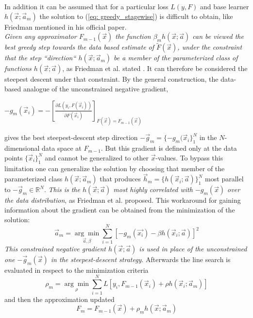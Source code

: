 \documentclass[12pt, a4paper]{article}
\begin{document}
In addition it can be assumed that for a particular loss $L(y,F)$ and base learner $h(\vec{x};\vec{a}_m)$ the solution to (\ref{eq: greedy_stagewise}) is difficult to obtain, like Friedman mentioned in his official paper.
\\
\textit{Given any approximator $F_{m-1}(\vec{x})$ the function $\beta_m h(\vec{x};\vec{a})$ can be viewed the best greedy step towards the data based estimate of $\tilde{F}(\vec{x})$, under the constraint that the step ``direction`` $h(\vec{x};\vec{a}_m)$ be a member of the parameterized class of functions $h(\vec{x};\vec{a})$}, as Friedman et al. stated \cite{Friedman2001}. It can therefore be considered the steepest descent under that constraint. By the general construction, the data-based analogue of the unconstrained negative gradient,
\begin{center}
    $- g_m(\vec{x}_i) = - [\frac{\partial L(y_i, F(\vec{x}_i))}{\partial F(\vec{x}_i)}]_{F(\vec{x}) = F_{m-1}(\vec{x})}$
\end{center}
gives the best steepest-descent step direction $-\vec{g}_m = \{-g_m(\vec{x}_i\}_1^N$ in the $N$-dimensional data space at $F_{m-1}$.
But this gradient is defined only at the data points $\{\vec{x}_i\}_1^N$ and cannot be generalized to other $\vec{x}$-values. 
To bypass this limitation one can generalize the solution by choosing that member of the parameterized class $h(\vec{x};\vec{a}_m)$ that produces $\vec{h}_{m} = \{h(\vec{x}_i ;\vec{a})\}_1^N$ most parallel to $-\vec{g}_m \in \mathbb{R}^N$. \textit{This is the $h(\vec{x};\vec{a})$ most highly correlated with $- g_m(\vec{x})$ over the data distribution}, as Friedman et al. \cite{Friedman2001} proposed. This workaround for gaining information about the gradient can be obtained from the minimization of the solution:
\begin{equation}
    \vec{a}_m = \underset{ \vec{a}, \beta }{\arg\min} 
    \sum_{i=1}^N [- g_{m}(\vec{x_i}) - \beta h(\vec{x}_i;\vec{a})]^2
\end{equation}
\textit{This constrained negative gradient $h(\vec{x};\vec{a})$ is used in place of the unconstrained one $-\vec{g}_m(\vec{x})$ in the steepest-descent strategy}. Afterwards the line search is evaluated in respect to the minimization criteria
\begin{equation}
        \rho_m = \underset{\rho}{\arg\min} \sum_{i=1}^N L[y_i,F_{m-1}(\vec{x}_i) + \rho h(\vec{x}_i;\vec{a}_m)]
\end{equation}
and then the approximation updated
\begin{equation}
    F_{m} = F_{m-1}(\vec{x}) + \rho_m h(\vec{x};\vec{a}_m)
\end{equation}
\end{document}
